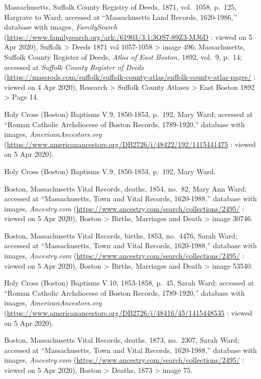 \begin{thebibliography}{999}
Massachusetts, Suffolk County Registry of Deeds, 1871, vol.\ 1058, p.\ 125, Hargrave to Ward; accessed at ``Massachusetts Land Records, 1620-1986,’’ database with images, \textit{FamilySearch} (\url{https://www.familysearch.org/ark:/61903/3:1:3QS7-89Z3-MJ6D} : viewed on 5 Apr 2020), Suffolk > Deeds 1871 vol 1057-1058 > image 496; Massachusetts, Suffolk County Register of Deeds, \textit{Atlas of East Boston,} 1892, vol.\ 9, p.\ 14; accessed at \textit{Suffolk County Register of Deeds} (\url{https://massrods.com/suffolk/suffolk-county-atlas/suffolk-county-atlas-pages/} : viewed on 4 Apr 2020), Research > Suffolk County Atlases > East Boston 1892 > Page 14.

Holy Cross (Boston) Baptisms V.9, 1850-1853, p.\ 192, Mary Ward; accessed at ``Roman Catholic Archdiocese of Boston Records, 1789-1920,'' database with images, \textit{AmericanAncestors.org} (\url{https://www.americanancestors.org/DB2726/i/48422/192/1415441475} : viewed on 5 Apr 2020).	

Holy Cross (Boston) Baptisms V.9, 1850-1853, p.\ 192, Mary Ward.

Boston, Massachusetts Vital Records, deaths, 1854, no.\ 82, Mary Ann Ward; accessed at ``Massachusetts, Town and Vital Records, 1620-1988,'' database with images, \textit{Ancestry.com} (\url{https://www.ancestry.com/search/collections/2495/} : viewed on 5 Apr 2020), Boston > Births, Marriages and Death > image 30746.

Boston, Massachusetts Vital Records, births, 1853, no.\ 4476, Sarah Ward; accessed at ``Massachusetts, Town and Vital Records, 1620-1988,'' database with images, \textit{Ancestry.com} (\url{https://www.ancestry.com/search/collections/2495/} : viewed on 5 Apr 2020), Boston > Births, Marriages and Death > image 53540.

Holy Cross (Boston) Baptisms V.10, 1853-1858, p.\ 45, Sarah Ward; accessed at ``Roman Catholic Archdiocese of Boston Records, 1789-1920,'' database with images, \textit{AmericanAncestors.org} (\url{https://www.americanancestors.org/DB2726/i/48416/45/1415448535} : viewed on 5 Apr 2020).	

Boston, Massachusetts Vital Records, deaths, 1873, no.\ 2307, Sarah Ward; accessed at ``Massachusetts, Town and Vital Records, 1620-1988,'' database with images, \textit{Ancestry.com} (\url{https://www.ancestry.com/search/collections/2495/} : viewed on 5 Apr 2020), Boston > Deaths, 1873 > image 75.


\end{thebibliography}
